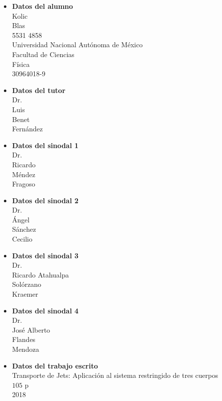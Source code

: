 \begin{itemize}

\item \textbf{Datos del alumno} \\ Kolic \\ Blas \\ 5531 4858 \\ Universidad Nacional Autónoma de México \\ Facultad de Ciencias \\ Física \\ 30964018-9

\item \textbf{Datos del tutor} \\ Dr. \\ Luis \\ Benet \\ Fernández

\item \textbf{Datos del sinodal 1} \\ Dr. \\ Ricardo \\ Méndez \\ Fragoso

\item \textbf{Datos del sinodal 2} \\ Dr. \\ Ángel \\ Sánchez \\ Cecilio

\item \textbf{Datos del sinodal 3} \\ Dr. \\ Ricardo Atahualpa \\ Solórzano \\ Kraemer

\item \textbf{Datos del sinodal 4} \\ Dr. \\ José Alberto \\ Flandes \\ Mendoza

\item \textbf{Datos del trabajo escrito} \\ Transporte de Jets: Aplicación al sistema restringido de tres cuerpos \\ $105$ p \\ 2018

\end{itemize}